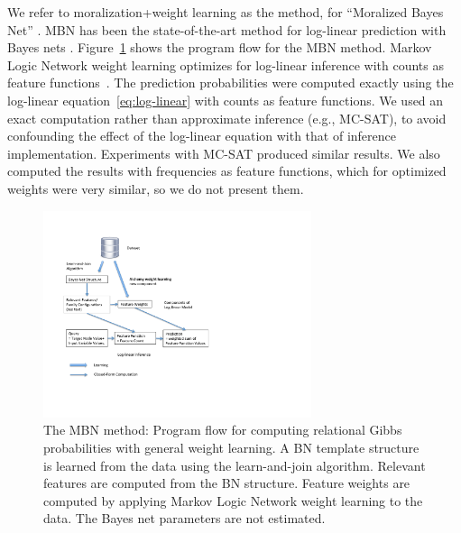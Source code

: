 \documentclass[twoside,11pt]{article}
\begin{document}
We refer to moralization+weight learning as the  method, for ``Moralized Bayes Net''   \cite{Khosravi2010}. 
MBN has been the state-of-the-art method for log-linear prediction with Bayes nets \cite{Schulte2012}. Figure~\ref{fig:mbn-flow} shows the program flow for the MBN method.
Markov Logic Network weight learning optimizes for log-linear inference with counts as feature functions~\cite{Schulte2011}. The prediction probabilities were computed exactly using the log-linear equation~\ref{eq:log-linear} with counts as feature functions. We used an exact computation rather than approximate inference
(e.g., MC-SAT), to avoid confounding the effect of the log-linear equation with that of inference implementation. Experiments with MC-SAT produced similar results. We also computed the results with frequencies as feature functions, which for optimized weights were very similar, so we do not present them. 


\begin{figure}[htbp]
\begin{center}

\includegraphics[width=0.7\textwidth]{figures/mbn-regress}
\caption{The MBN method: Program flow for computing relational Gibbs probabilities with general weight learning. A BN template structure is learned from the data using the learn-and-join algorithm. Relevant features are computed from the BN structure. Feature weights are computed by applying Markov Logic Network weight learning to the data. The Bayes net parameters are not estimated.}
\label{fig:mbn-flow}
\end{center}
\end{figure}
\end{document}
